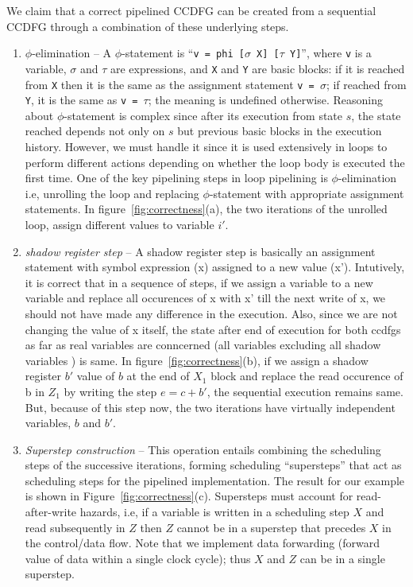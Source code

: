 We claim that a correct pipelined CCDFG can be created from a sequential CCDFG through a combination of these underlying steps.

\begin{enumerate}

\item $\phi$-elimination -- A $\phi$-statement is ``{\tt v = phi
[$\sigma$ X] [$\tau$ Y]}'', where {\tt v} is a
variable, $\sigma$ and $\tau$ are expressions, and {\tt X}
and {\tt Y} are basic blocks: if it is reached from {\tt X} then it is the same as the assignment statement {\tt v = $\sigma$}; if reached from {\tt Y}, it is the same as {\tt v = $\tau$}; the meaning is undefined otherwise.
Reasoning about $\phi$-statement is complex since after its
execution from state $s$, the state reached depends not only
on $s$ but previous basic blocks in the execution history.
However, we must handle it since it is used extensively in
loops to perform different actions depending on whether the
loop body is executed the first time. One of the key pipelining steps in loop pipelining is
$\phi$-elimination i.e, unrolling the loop and replacing
$\phi$-statement with appropriate assignment statements. In figure~\ref{fig:correctness}(a), the two iterations of the unrolled loop, assign different values to variable $i'$.
	
\noindent \item \emph {shadow register step} -- A shadow register step is basically an assignment 
statement with symbol expression (x) assigned to a new value (x'). Intutively, it is correct that in a sequence of steps, if we assign a variable to a new variable and replace all occurences of x with x' till the next write of x, we should 
not have made any difference in the execution. Also, since we are not changing the value of x itself, the state after end of execution for both ccdfgs as far as real variables are conncerned (all variables excluding all shadow variables ) is same. In figure~\ref{fig:correctness}(b), if we assign a shadow register $b'$ value of $b$ at the end of $X_1$ block and replace the read occurence of b in $Z_1$ by writing the step $ e = c + b' $, the sequential execution remains same.
But, because of this step now, the two iterations have virtually independent variables, $b$ and $b'$. 

\item \emph{Superstep construction} -- This operation entails combining the scheduling steps of the successive iterations, forming scheduling ``supersteps'' that act as scheduling steps for the pipelined implementation.  The result for our example is shown in
Figure~\ref{fig:correctness}(c).  Supersteps must
account for read-after-write hazards, i.e, if a variable is written in a scheduling step $X$ and read subsequently in
$Z$ then $Z$ cannot be in a superstep that precedes $X$ in the control/data flow.  Note that we implement data forwarding (forward value of data within a single clock cycle); thus $X$ and $Z$ can be in a single superstep.

\end{enumerate}
	
